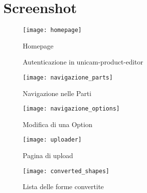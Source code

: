 \chapter{Screenshot}
\label{chap:screenshot}
\begin{figure}[htpb!]
	\centering
	\texttt{[image: homepage]}
	\caption{Homepage}
	\label{fig:homepage}
\end{figure}
\begin{figure}[htpb!]
	\centering
	 \quad
	\caption{Autenticazione in unicam-product-editor}
	\label{fig:subfig}
\end{figure}
\newpage
\begin{figure}[htpb!]
	\centering
	\texttt{[image: navigazione\_parts]}
	\caption{Navigazione nelle Parti}
	\label{fig:navigazione_parts}
\end{figure}
\begin{figure}[htpb!]
	\centering
	\texttt{[image: navigazione\_options]}
	\caption{Modifica di una Option}
	\label{fig:navigazione_options}
\end{figure}
\begin{figure}[htpb!]
	\centering
	\texttt{[image: uploader]}
	\caption{Pagina di upload}
	\label{fig:uploader}
\end{figure}
\newpage
\begin{figure}[htpb!]
	\centering
	\texttt{[image: converted\_shapes]}
	\caption{Lista delle forme convertite}
	\label{fig:converted_shapes}
\end{figure}